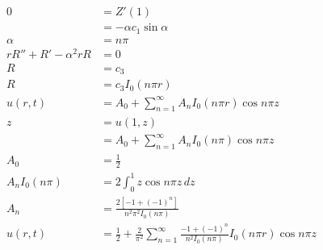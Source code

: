 \documentclass{article}
\begin{document}
\begin{align*}
  0                                                    & = Z'(1)                                                                                                          \\
                                                       & = -\alpha c_1 \sin \alpha                                                                                        \\
  \alpha                                               & = n \pi                                                                                                          \\
  r R'' + R' - \alpha^2 r R                            & = 0                                                                                                              \\
  R                                                    & = c_3                                                                                                            \\
  R                                                    & = c_3 I_0(n \pi r)                                                                                               \\
  u(r, t)                                              & = A_0 + \sum_{n = 1}^\infty A_n I_0(n \pi r) \cos n \pi z                                                        \\
  z                                                    & = u(1, z)                                                                                                        \\
                                                       & = A_0 + \sum_{n = 1}^\infty A_n I_0(n \pi) \cos n \pi z                                                          \\
  A_0                                                  & = \frac{1}{2}                                                                                                    \\
  A_n I_0(n \pi)                                       & = 2 \int_0^1 z \cos n \pi z \,d z                                                                                \\
  A_n                                                  & = \frac{2 [-1 + (-1)^n]}{n^2 \pi^2 I_0(n \pi)}                                                                   \\
  u(r, t)                                              & = \frac{1}{2} + \frac{2}{\pi^2} \sum_{n = 1}^\infty \frac{-1 + (-1)^n}{n^2 I_0(n \pi)} I_0(n \pi r) \cos n \pi z
\end{align*}
\end{document}
